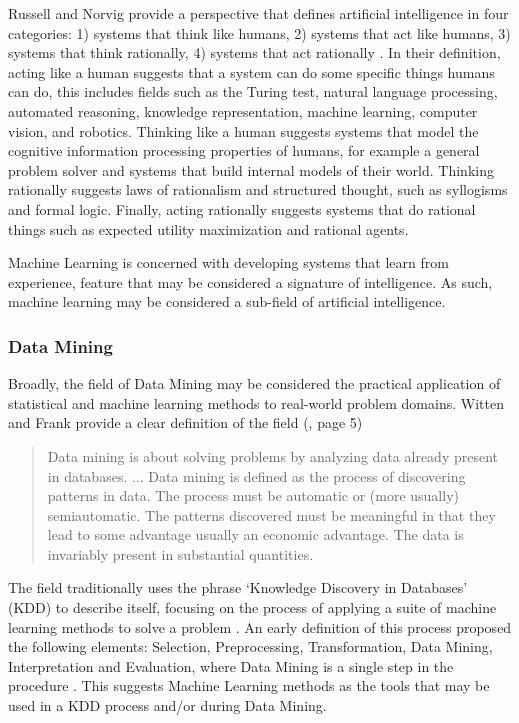 Russell and Norvig provide a perspective that defines artificial intelligence in four categories: 1) systems that think like humans, 2) systems that act like humans, 3) systems that think rationally, 4) systems that act rationally \cite{Russell2009}. In their definition, acting like a human suggests that a system can do some specific things humans can do, this includes fields such as the Turing test, natural language processing, automated reasoning, knowledge representation, machine learning, computer vision, and robotics. Thinking like a human suggests systems that model the cognitive information processing properties of humans, for example a general problem solver and systems that build internal models of their world. Thinking rationally suggests laws of rationalism and structured thought, such as syllogisms and formal logic. Finally, acting rationally suggests systems that do rational things such as expected utility maximization and rational agents. 

Machine Learning is concerned with developing systems that learn from experience, feature that may be considered a signature of intelligence. As such, machine learning may be considered a sub-field of artificial intelligence.

\subsubsection{Data Mining}
Broadly, the field of Data Mining may be considered the practical application of statistical and machine learning methods to real-world problem domains. 
Witten and Frank provide a clear definition of the field (\cite{Witten2011}, page 5)

\begin{quotation}
Data mining is about solving problems by analyzing data already present in databases. ... Data mining is defined as the process of discovering patterns in data. The process must be automatic or (more usually) semiautomatic. The patterns discovered must be meaningful in that they lead to some advantage usually an economic advantage. The data is invariably present in substantial quantities.
\end{quotation}

The field traditionally uses the phrase `Knowledge Discovery in Databases' (KDD) to describe itself, focusing on the process of applying a suite of machine learning methods to solve a problem \cite{Frawley1992}. An early definition of this process proposed the following elements: Selection, Preprocessing, Transformation, Data Mining, Interpretation and Evaluation, where Data Mining is a single step in the procedure \cite{Fayyad1996a}.
This suggests Machine Learning methods as the tools that may be used in a KDD process and/or during Data Mining.

